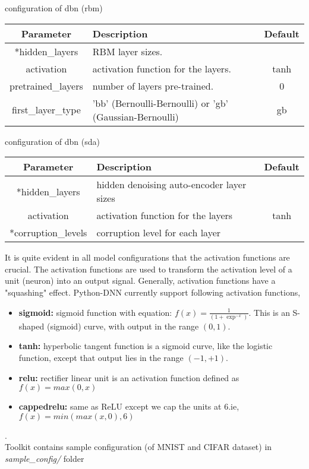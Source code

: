 \begin{table}[!htbp] 
 \begin{center}
  	\medskip  \small configuration of dbn (rbm)
	\begin{tabular}{|c|p{8cm}|c|} \hline
   	\textbf{Parameter} & \textbf{Description} & \textbf{Default}\\  \hline
	*hidden\_layers &  RBM layer sizes. & \\ \hline
	activation & activation function for the layers. & tanh \\ \hline
	pretrained\_layers & number of layers  pre-trained. & 0 \\ \hline
	first\_layer\_type & 'bb' (Bernoulli-Bernoulli) or 'gb' (Gaussian-Bernoulli) & gb  \\ 	\hline 
	\end{tabular}		
\end{center}
\end{table} 
\begin{table}[!htbp] 
 \begin{center}
  	\medskip  \small configuration of dbn (sda)
	\begin{tabular}{|c|p{8cm}|c|} \hline
   	\textbf{Parameter} & \textbf{Description} & \textbf{Default}\\  \hline
	*hidden\_layers &  hidden denoising auto-encoder layer sizes & \\ \hline
	activation & activation function for the layers & tanh \\ \hline
	*corruption\_levels & corruption level for each layer &  \\ \hline
	\end{tabular}		
\end{center} 
\end{table} 
\noindent It is quite evident in all model configurations that the activation functions are crucial.  The activation functions are used to transform the activation level of a unit (neuron) into an output signal.  Generally, activation functions have a "squashing" effect.  Python-DNN currently support following activation functions,
\begin{itemize}
\item {\textbf{sigmoid:} sigmoid function with equation: $f(x) = \frac{1}{(1 + \exp^{-x})}$.  This is an S-shaped (sigmoid) curve, with output in the range $(0,1)$.}
\item {\textbf{tanh:} hyperbolic tangent function is a sigmoid curve, like the logistic function, except that output lies in the range $(-1,+1)$.} 
\item {\textbf{relu:} rectifier linear unit is an activation function defined as $f(x) = max(0, x)$}
\item {\textbf{cappedrelu:} same as ReLU except we cap the units at 6.ie, $f(x) = min(max(x,0),6)$}
\end{itemize}
.\\
Toolkit contains sample configuration (of MNIST and CIFAR dataset) in \textit{sample\_config/} folder
\clearpage

